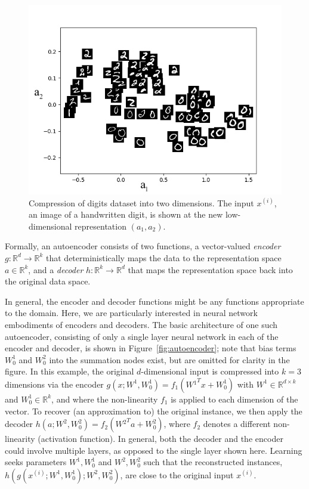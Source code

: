 \begin{figure}[h!]
  \centering
  \includegraphics[width= .5\textwidth]{figures/autoencoder_mnist.png}
  \caption{\small Compression of digits dataset into two
    dimensions. The input $x^{(i)}$, an image of a handwritten
    digit, is shown at the new low-dimensional representation
    $(a_1,a_2)$.}
  \label{fig:illustration}
\end{figure}

Formally, an autoencoder consists of two functions, a vector-valued
\textit{encoder} $g : \mathbb{R}^d \rightarrow \mathbb{R}^k$ that
deterministically maps the data to the representation space $a \in
  \mathbb{R}^k$, and a \textit{decoder} $h : \mathbb{R}^k \rightarrow
  \mathbb{R}^d$ that maps the representation space back into the
original data space.

In general, the encoder and decoder functions might be any functions
appropriate to the domain. Here, we are particularly interested in
neural network embodiments of encoders and decoders.
The basic architecture of one such autoencoder, consisting of only a single
layer neural network in each of the encoder and decoder, is shown in
Figure~\ref{fig:autoencoder}; note that bias terms $W^1_0$ and $W^2_0$ into
the summation nodes exist, but are omitted for clarity in the figure.
In this example, the original
$d$-dimensional input is compressed into $k=3$ dimensions via the
encoder $g(x; W^1, W^1_0)=f_1(W{^1}^T x + W^1_0)$ with $W^1 \in
  \mathbb{R}^{d \times k}$ and $W^1_0 \in \mathbb{R}^k$,
and where the non-linearity $f_1$ is applied to each
dimension of the vector. To recover (an approximation to) the
original instance, we then apply the decoder $h(a; W^2, W^2_0) = f_2(W{^2}^T
  a + W^2_0)$, where $f_2$ denotes a different non-linearity (activation
function). In general, both the decoder and the encoder could involve
multiple layers, as opposed to the single layer shown here. Learning
seeks parameters $W^1, W^1_0$ and $W^2, W^2_0$ such that the reconstructed
instances, $h(g(x^{(i)}; W^{1}, W^1_0); W^{2}, W^2_0)$, are close to the original
input $x^{(i)}.$

